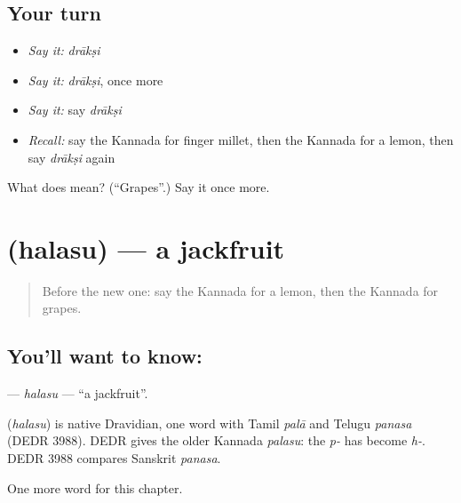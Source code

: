 \subsection*{Your turn}
\begin{itemize}
\raggedright
  \item \emph{Say it:} \emph{drākṣi}
  \item \emph{Say it:} \emph{drākṣi}, once more
  \item \emph{Say it:} say \emph{drākṣi}
  \item \emph{Recall:} say the Kannada for finger millet, then the Kannada for a lemon, then say \emph{drākṣi} again
\end{itemize}

\begin{tcolorbox}[breakable,colback=teal!4,colframe=teal!35!black,title={Before you move on}]
What does  mean? (\textquotedblleft{}Grapes\textquotedblright{}.) Say it once more.
\end{tcolorbox}
\section[\texorpdfstring{\kn{ಹಲಸು} (halasu)}{ಹಲಸು (halasu)}]{ (halasu) — a jackfruit}

\label{lesson:KA-C126-halasu}



\begin{quote}
Before the new one: say the Kannada for a lemon, then the Kannada for grapes.
\end{quote}

\subsection*{You'll want to know: }
\textbf{} — \emph{halasu} — \textquotedblleft{}a jackfruit\textquotedblright{}.

\begin{cousinweb}
\textbf{} (\emph{halasu}) is native Dravidian, one word with Tamil \emph{palā} and Telugu \emph{panasa} (DEDR 3988). DEDR gives the older Kannada \emph{palasu}: the \emph{p-} has become \emph{h-}. DEDR 3988 compares Sanskrit \emph{panasa}.
\end{cousinweb}

\begin{grammarlens}[title={What you've built}]
One more word for this chapter.
\end{grammarlens}

